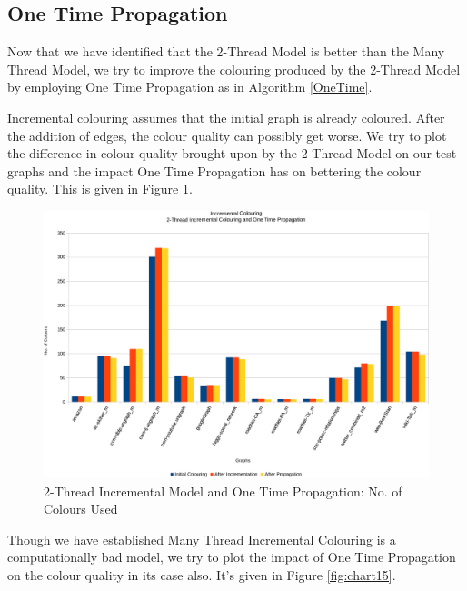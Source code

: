 \documentclass[MTech]{iitmdiss}
\begin{document}
\subsection{One Time Propagation}
Now that we have identified that the 2-Thread Model is better than the Many Thread Model, we try to improve the colouring produced by the 2-Thread Model by employing One Time Propagation as in Algorithm \ref{OneTime}.

Incremental colouring assumes that the initial graph is already coloured. After the addition of edges, the colour quality can possibly get worse. We try to plot the difference in colour quality brought upon by the 2-Thread Model on our test graphs and the impact One Time Propagation has on bettering the colour quality. This is given in Figure \ref{fig:chart14}.

\begin{figure}[h]
    \centering
    \includegraphics[width=\textwidth,keepaspectratio=true]{chartNewest11.pdf}
    \caption{
        2-Thread Incremental Model and One Time Propagation: No. of Colours Used
    }
    \label{fig:chart14}
\end{figure}

Though we have established Many Thread Incremental Colouring is a computationally bad model, we try to plot the impact of One Time Propagation on the colour quality in its case also. It's given in Figure \ref{fig:chart15}.
\end{document}

